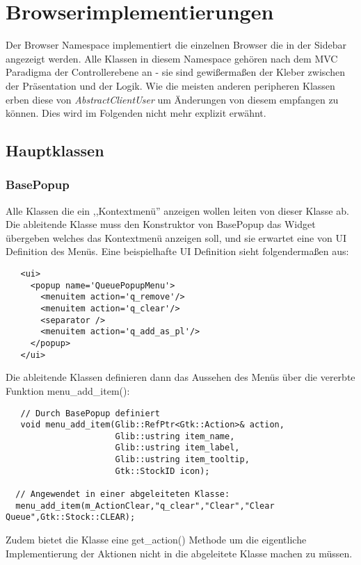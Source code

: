 \section{Browserimplementierungen}

Der Browser Namespace implementiert die einzelnen Browser die in der Sidebar angezeigt werden.
Alle Klassen in diesem Namespace gehören nach dem MVC Paradigma der Controllerebene an - sie sind gewißermaßen der Kleber zwischen der Präsentation und der Logik.
Wie die meisten anderen peripheren Klassen erben diese von \emph{AbstractClientUser} um Änderungen von diesem empfangen zu können. Dies wird im Folgenden nicht mehr explizit erwähnt.

\subsection{Hauptklassen}
\subsubsection{BasePopup}

Alle Klassen die ein ,,Kontextmenü'' anzeigen wollen leiten von dieser Klasse ab.
Die ableitende Klasse muss den Konstruktor von BasePopup das Widget übergeben welches das Kontextmenü anzeigen soll, 
und sie erwartet eine von UI Definition des Menüs.
Eine beispielhafte UI Definition sieht folgendermaßen aus:
\begin{verbatim}
   <ui>
     <popup name='QueuePopupMenu'>
       <menuitem action='q_remove'/>
       <menuitem action='q_clear'/>
       <separator />
       <menuitem action='q_add_as_pl'/>
     </popup>
   </ui>
\end{verbatim}

Die ableitende Klassen definieren dann das Aussehen des Menüs über die vererbte Funktion menu\_add\_item():
\begin{verbatim}
   // Durch BasePopup definiert
   void menu_add_item(Glib::RefPtr<Gtk::Action>& action,
                      Glib::ustring item_name,
                      Glib::ustring item_label,
                      Glib::ustring item_tooltip,
                      Gtk::StockID icon);
                      
  // Angewendet in einer abgeleiteten Klasse:
  menu_add_item(m_ActionClear,"q_clear","Clear","Clear Queue",Gtk::Stock::CLEAR);
\end{verbatim} 

Zudem bietet die Klasse eine get\_action() Methode um die eigentliche Implementierung der Aktionen nicht in die abgeleitete Klasse machen zu müssen. 

